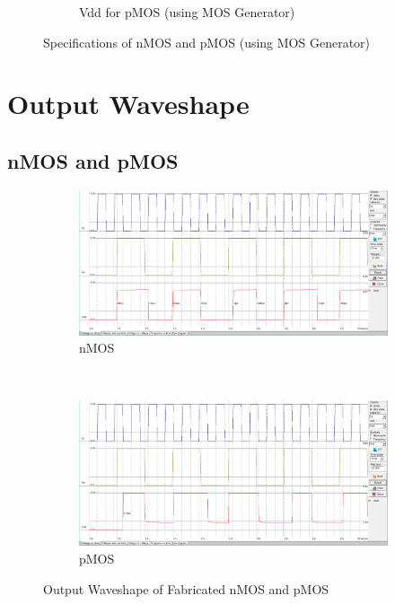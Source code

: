 \documentclass[a4paper,12pt]{article}
\begin{document}
\begin{figure}[H]
\begin{subfigure}[t]{0.32\textwidth}
			\caption{Vdd for pMOS (using MOS Generator)}
			\label{fig:3-j}
		\end{subfigure}
		
		\caption{Specifications of nMOS and pMOS (using MOS Generator)}
		\label{fig:2}
	\end{figure}
	
	
	
	\section{Output Waveshape }
	\subsection{nMOS and pMOS}
	\begin{figure}[H]
		\centering
		\begin{subfigure}[t]{1\textwidth}
			\centering
			\includegraphics[width=1\linewidth]{Images/nmos/nsim1.png}
			\caption{nMOS}
			\label{fig:enter-label}
		\end{subfigure}
		\\[1cm]
		\begin{subfigure}[t]{1\textwidth}
			\centering
			\includegraphics[width=1\linewidth]{Images/pmos/psim1.2.png}
			\caption{pMOS}
			\label{fig:enter-label}
		\end{subfigure}
		\caption{Output Waveshape of Fabricated nMOS and pMOS}
	\end{figure}
	
\end{document}
